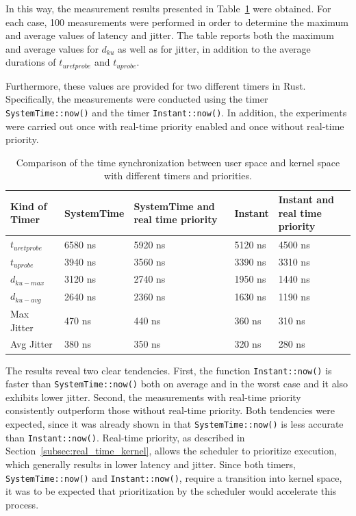 In this way, the measurement results presented in Table~\ref{tab:timer_comparison} were obtained.  
For each case, 100 measurements were performed in order to determine the maximum and average values of latency and jitter.  
The table reports both the maximum and average values for $d_{ku}$ as well as for jitter, in addition to the average durations of $t_{uretprobe}$ and $t_{uprobe}$.  

Furthermore, these values are provided for two different timers in Rust.  
Specifically, the measurements were conducted using the timer \texttt{SystemTime::now()} and the timer \texttt{Instant::now()}.
In addition, the experiments were carried out once with real-time priority enabled and once without real-time priority.  

\begin{table}[ht]
\centering
\begin{tabular}{ ||p{3.5cm} || p{2.5cm} | p{2.5cm} | p{2.5cm} | p{2.5cm}|| } 
 \hline
\textbf{Kind of Timer} & \textbf{SystemTime} & \textbf{SystemTime and real time priority} & \textbf{Instant} & \textbf{Instant and real time priority} \\ 
   \hline\hline
   $t_{uretprobe}$ & 6580 ns & 5920 ns & 5120 ns & 4500 ns \\
   \hline
   $t_{uprobe}$ & 3940 ns & 3560 ns & 3390 ns & 3310 ns \\
   \hline
 $d_{ku-max}$ & 3120 ns & 2740 ns & 1950 ns & 1440 ns  \\ 
 \hline
  $d_{ku-avg}$ & 2640 ns & 2360 ns & 1630 ns & 1190 ns  \\ 
 \hline
 Max Jitter & 470 ns & 440 ns & 360 ns & 310 ns  \\ 
 \hline 
 Avg Jitter & 380 ns & 350 ns & 320 ns & 280 ns \\ 
 \hline
\end{tabular}
\caption{Comparison of the time synchronization between user space and kernel space with different timers and priorities.}
\label{tab:timer_comparison}
\end{table}

The results reveal two clear tendencies.  
First, the function \texttt{Instant::now()} is faster than \texttt{SystemTime::now()} both on average and in the worst case and it also exhibits lower jitter.  
Second, the measurements with real-time priority consistently outperform those without real-time priority.  
Both tendencies were expected, since it was already shown in \cite{systemtime} that \texttt{SystemTime::now()} is less accurate than \texttt{Instant::now()}.  
Real-time priority, as described in Section~\ref{subsec:real_time_kernel}, allows the scheduler to prioritize execution, which generally results in lower latency and jitter.  
Since both timers, \texttt{SystemTime::now()} and \texttt{Instant::now()}, require a transition into kernel space, it was to be expected that prioritization by the scheduler would accelerate this process.  

